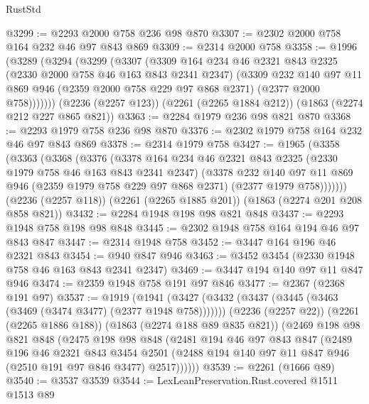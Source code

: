 \begin{lexlean}{RustStd}
\begin{coremodule}
@3299 := @2293 @2000 @758 @236 @98 @870
@3307 := @2302 @2000 @758 @164 @232 @46 @97 @843 @869
@3309 := @2314 @2000 @758
@3358 := @1996
    (@3289
      (@3294
        (@3299
          (@3307
            (@3309
              @164
              @234
              @46
              @2321
              @843
              @2325
              (@2330 @2000 @758 @46 @163 @843 @2341 @2347)
              (@3309
                @232
                @140
                @97
                @11
                @869
                @946
                (@2359 @2000 @758 @229 @97 @868 @2371)
                (@2377 @2000 @758)))))))
    (@2236 (@2257 @123))
    (@2261 (@2265 @1884 @212))
    (@1863 (@2274 @212 @227 @865 @821))
@3363 := @2284 @1979 @236 @98 @821 @870
@3368 := @2293 @1979 @758 @236 @98 @870
@3376 := @2302 @1979 @758 @164 @232 @46 @97 @843 @869
@3378 := @2314 @1979 @758
@3427 := @1965
    (@3358
      (@3363
        (@3368
          (@3376
            (@3378
              @164
              @234
              @46
              @2321
              @843
              @2325
              (@2330 @1979 @758 @46 @163 @843 @2341 @2347)
              (@3378
                @232
                @140
                @97
                @11
                @869
                @946
                (@2359 @1979 @758 @229 @97 @868 @2371)
                (@2377 @1979 @758)))))))
    (@2236 (@2257 @118))
    (@2261 (@2265 @1885 @201))
    (@1863 (@2274 @201 @208 @858 @821))
@3432 := @2284 @1948 @198 @98 @821 @848
@3437 := @2293 @1948 @758 @198 @98 @848
@3445 := @2302 @1948 @758 @164 @194 @46 @97 @843 @847
@3447 := @2314 @1948 @758
@3452 := @3447 @164 @196 @46 @2321 @843
@3454 := @940 @847 @946
@3463 := @3452 @3454 (@2330 @1948 @758 @46 @163 @843 @2341 @2347)
@3469 := @3447 @194 @140 @97 @11 @847 @946
@3474 := @2359 @1948 @758 @191 @97 @846
@3477 := @2367 (@2368 @191 @97)
@3537 := @1919
    (@1941
      (@3427 (@3432 (@3437 (@3445 (@3463 (@3469 (@3474 @3477) (@2377 @1948 @758)))))))
      (@2236 (@2257 @22))
      (@2261 (@2265 @1886 @188))
      (@1863 (@2274 @188 @89 @835 @821))
      (@2469
        @198
        @98
        @821
        @848
        (@2475
          @198
          @98
          @848
          (@2481
            @194
            @46
            @97
            @843
            @847
            (@2489
              @196
              @46
              @2321
              @843
              @3454
              @2501
              (@2488 @194 @140 @97 @11 @847 @946 (@2510 @191 @97 @846 @3477) @2517))))))
@3539 := @2261 (@1666 @89)
@3540 := @3537 @3539
@3544 := LexLeanPreservation.Rust.covered @1511 @1513 @89

\end{coremodule}
\end{lexlean}
